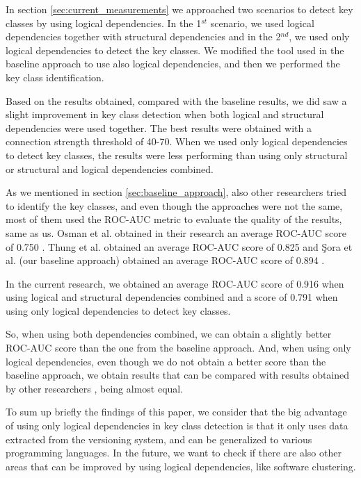 \documentclass[runningheads]{comsis2}
\begin{document}
In section \ref{sec:current_measurements} we approached two scenarios to detect key classes by using logical dependencies. In the 1$^{st}$ scenario, we used logical dependencies together with structural dependencies and in the 2$^{nd}$, we used only logical dependencies to detect the key classes. We modified the tool used in the baseline approach to use also logical dependencies, and then we performed the key class identification. 

Based on the results obtained, compared with the baseline results, we did saw a slight improvement in key class detection when both logical and structural dependencies were used together. The best results were obtained with a connection strength threshold of 40-70. When we used only logical dependencies to detect key classes, the results were less performing than using only structural or structural and logical dependencies combined.

As we mentioned in section \ref{sec:baseline_approach}, also other researchers tried to identify the key classes, and even though the approaches were not the same, most of them used the ROC-AUC metric to evaluate the quality of the results, same as us. 
Osman et al. obtained in their research an average ROC-AUC score of 0.750 \cite{6676885}. Thung et al. obtained an average ROC-AUC score of 0.825 \cite{rocclasification}  and Şora et al. (our baseline approach) obtained an average ROC-AUC score of 0.894 \cite{Finding-key-classes}.

In the current research, we obtained an average ROC-AUC score of 0.916 when using logical and structural dependencies combined and a score of 0.791 when using only logical dependencies to detect key classes.

So, when using both dependencies combined, we can obtain a slightly better ROC-AUC score than the one from the baseline approach. And, when using only logical dependencies, even though we do not obtain a better score than the baseline approach, we obtain results that can be compared with results obtained by other researchers \cite{6676885}, being almost equal. 

To sum up briefly the findings of this paper, we consider that the big advantage of using only logical dependencies in key class detection is that it only uses data extracted from the versioning system, and can be generalized to various programming languages. In the future, we want to check if there are also other areas that can be improved by using logical dependencies, like software clustering.
\end{document}
